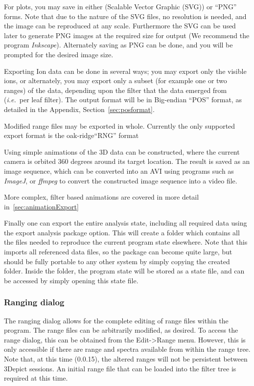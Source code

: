\documentclass[10pt]{article}
\begin{document}
For plots, you may save in either (Scalable Vector Graphic (SVG)) or ``PNG'' forms. Note that due to the nature of the SVG files, no resolution is needed, and the image can be reproduced at any scale. Furthermore the SVG can be used later to generate PNG images at the required size for output (We recommend the program \textit{Inkscape}). Alternately saving as PNG can be done, and you will be prompted for the desired image size.

Exporting Ion data can be done in several ways; you may export only the visible ions, or alternately, you may export only a subset (for example one or two ranges) of the data, depending upon the filter that the data emerged from (\emph{i.e.}\ per leaf filter). The output format will be in Big-endian ``POS'' format, as  detailed in the Appendix, Section~\ref{sec:posformat}.

Modified range files may be exported in whole. Currently the only supported export format is the oak-ridge``RNG'' format

Using simple animations of the 3D data can be constructed, where the current camera is orbited 360 degrees around its target location. The result is saved as an image sequence, which can be converted into an AVI using programs such as \emph{ImageJ}, or \emph{ffmpeg} to convert the constructed image sequence into a video file.

More complex, filter based animations are covered in more detail in~\ref{sec:animationExport}

Finally one can export the entire analysis state, including all required data using the export analysis package option. This will create  a folder which contains all the files needed to reproduce the current program state elsewhere. Note that this imports all referenced data files, so the package can become quite large, but should be fully portable to any other system by simply copying the created folder. Inside the folder, the program state will be stored as a state file, and can be accessed by simply opening this state file.

\subsubsection{Ranging dialog}
The ranging dialog allows for the complete editing of range files within the program. The range files can be arbitrarily modified, as desired. To access the range dialog, this can be obtained from the Edit->Range menu. However, this is only accessible if there are range and spectra available from within the range tree. Note that, at this time (0.0.15), the altered ranges will not be persistent between 3Depict sessions. An initial range file that can be loaded into the filter tree is required at this time.
\end{document}
